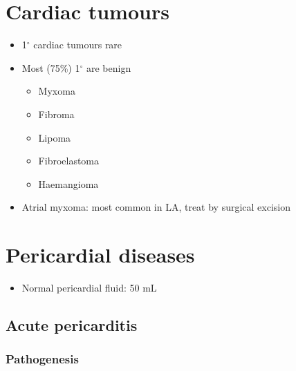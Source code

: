 \documentclass[
  12pt,
]{memoir}
\providecommand{\tightlist}{%
  \setlength{\itemsep}{0pt}\setlength{\parskip}{0pt}}
\begin{document}
\hypertarget{cardiac-tumours}{%
\section{Cardiac tumours}\label{cardiac-tumours}}

\begin{itemize}
\tightlist
\item
  1\(^\circ\) cardiac tumours rare
\item
  Most (75\%) 1\(^\circ\) are benign

  \begin{itemize}
  \tightlist
  \item
    Myxoma
  \item
    Fibroma
  \item
    Lipoma
  \item
    Fibroelastoma
  \item
    Haemangioma
  \end{itemize}
\item
  Atrial myxoma: most common in LA, treat by surgical excision
\end{itemize}

\hypertarget{pericardial-diseases}{%
\section{Pericardial diseases}\label{pericardial-diseases}}

\begin{itemize}
\tightlist
\item
  Normal pericardial fluid: 50 mL \vspace{-3mm}
\end{itemize}

\hypertarget{acute-pericarditis}{%
\subsection{Acute pericarditis}\label{acute-pericarditis}}

\hypertarget{pathogenesis-12}{%
\subsubsection{Pathogenesis}\label{pathogenesis-12}}
\end{document}
